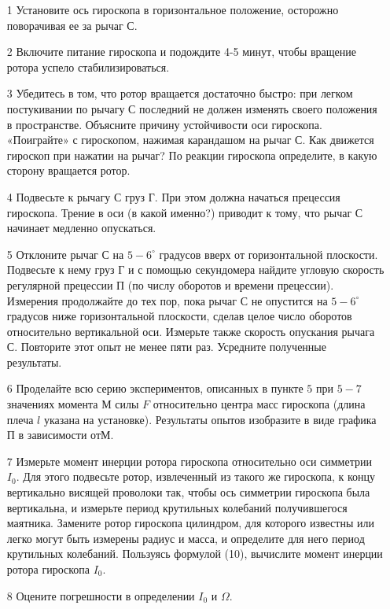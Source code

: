 \documentclass[a4paper,12pt]{article} %
\begin{document}
\begin{itemize}
\item[1] Установите ось гироскопа в горизонтальное положение, осторожно поворачивая ее за рычаг $\text{С}$.
\item[2] Включите питание гироскопа и подождите 4-5 минут, чтобы вращение ротора успело стабилизироваться.
\item[3] Убедитесь в том, что ротор вращается достаточно быстро: при легком постукивании по рычагу $\text{С}$ последний не должен изменять своего положения в пространстве. Объясните причину устойчивости оси гироскопа. «Поиграйте» с гироскопом, нажимая карандашом на рычаг $\text{С}$. Как движется гироскоп при нажатии на рычаг? По реакции гироскопа определите, в какую сторону вращается ротор.
\item[4]	Подвесьте к рычагу $\text{С}$ груз $\text{Г}$. При этом должна начаться прецессия гироскопа. Трение в оси (в какой именно?) приводит к тому, что рычаг $\text{С}$ начинает медленно опускаться.
\item[5] Отклоните рычаг $\text{С}$ на $5-6^{\circ}$ градусов вверх от горизонтальной плоскости. Подвесьте к нему груз $\text{Г}$ и с помощью секундомера найдите угловую скорость регулярной прецессии $\text{П}$ (по числу оборотов и времени прецессии). Измерения продолжайте до тех пор, пока рычаг $\text{С}$ не опустится на $5-6^{\circ}$ градусов ниже горизонтальной плоскости, сделав целое число оборотов относительно вертикальной оси. Измерьте также скорость опускания рычага $\text{С}$. Повторите этот опыт не менее пяти раз. Усредните полученные результаты.
\item[6] Проделайте всю серию экспериментов, описанных в пункте $5$ при $5-7$ значениях момента $\text{М}$ силы $F$ относительно центра масс гироскопа (длина плеча $l$ указана на установке). Результаты опытов изобразите в виде графика $\text{П}$ в зависимости от$\text{М}$.
\item[7]  Измерьте момент инерции ротора гироскопа относительно оси симметрии $I_0$. Для этого подвесьте ротор, извлеченный из такого же гироскопа, к концу вертикально висящей проволоки так, чтобы ось симметрии гироскопа была вертикальна, и измерьте период крутильных колебаний получившегося маятника. Замените ротор гироскопа цилиндром, для которого известны или легко могут быть измерены радиус и масса, и определите для него период крутильных колебаний. Пользуясь формулой (10), вычислите момент инерции ротора гироскопа $I_0$.
\item[8] Оцените погрешности в определении $I_0$ и $\Omega$.

\end{itemize}
\end{document}
